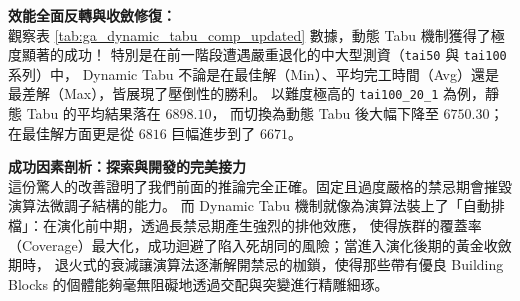 \documentclass[conference]{IEEEtran}
\begin{document}
\begin{table}[htbp]
\caption{GA (OX) Static Tabu 與 Dynamic Tabu 機制之結果比較}
\label{tab:ga_dynamic_tabu_comp_updated}
\centering
{}
\end{table}

\textbf{效能全面反轉與收斂修復：} \\
觀察表 \ref{tab:ga_dynamic_tabu_comp_updated} 數據，動態 Tabu 機制獲得了極度顯著的成功！
特別是在前一階段遭遇嚴重退化的中大型測資（\texttt{tai50} 與 \texttt{tai100} 系列）中，
Dynamic Tabu 不論是在最佳解（Min）、平均完工時間（Avg）還是最差解（Max），皆展現了壓倒性的勝利。
以難度極高的 \texttt{tai100\_20\_1} 為例，靜態 Tabu 的平均結果落在 $6898.10$，
而切換為動態 Tabu 後大幅下降至 $6750.30$；在最佳解方面更是從 $6816$ 巨幅進步到了 $6671$。

\textbf{成功因素剖析：探索與開發的完美接力} \\
這份驚人的改善證明了我們前面的推論完全正確。固定且過度嚴格的禁忌期會摧毀演算法微調子結構的能力。
而 Dynamic Tabu 機制就像為演算法裝上了「自動排檔」：在演化前中期，透過長禁忌期產生強烈的排他效應，
使得族群的覆蓋率（Coverage）最大化，成功迴避了陷入死胡同的風險；當進入演化後期的黃金收斂期時，
退火式的衰減讓演算法逐漸解開禁忌的枷鎖，使得那些帶有優良 Building Blocks 的個體能夠毫無阻礙地透過交配與突變進行精雕細琢。
\end{document}
